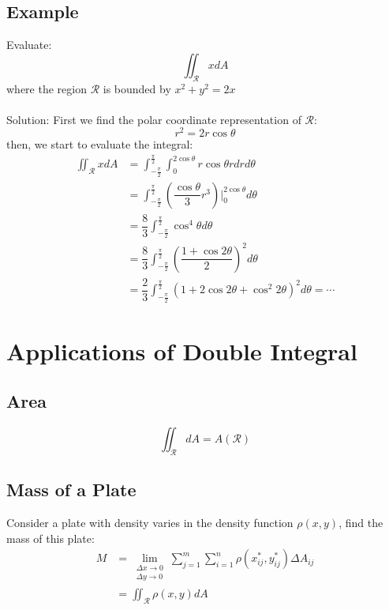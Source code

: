 \documentclass[UTF8,a4paper, 10pt, openany]{book}
\begin{document}
\subsection{Example}
Evaluate:
$$\iint_{\mathcal{R}}xdA$$
where the region $\mathcal{R}$ is bounded by $x^2+y^2=2x$\\ \\
Solution: First we find the polar coordinate representation of $\mathcal{R}$:\\
$$r^2=2r\cos \theta$$
then, we start to evaluate the integral:
\begin{align*}
\iint_{\mathcal{R}}xdA &= \int_{-\frac{\pi}{2}}^{\frac{\pi}{2}}\int_{0}^{2\cos \theta}r\cos \theta rdrd\theta \\
&= \int_{-\frac{\pi}{2}}^{\frac{\pi}{2}} \left(\dfrac{\cos \theta}{3}r^3\right)|_{0}^{2\cos \theta}d\theta \\
&= \dfrac{8}{3}\int_{-\frac{\pi}{2}}^{\frac{\pi}{2}}\cos^4\theta d\theta \\
&= \dfrac{8}{3}\int_{-\frac{\pi}{2}}^{\frac{\pi}{2}}\left(\dfrac{1+\cos 2\theta}{2}\right)^2d\theta \\
&= \dfrac{2}{3}\int_{-\frac{\pi}{2}}^{\frac{\pi}{2}}\left(1+2\cos 2\theta +\cos^2 2\theta \right)^2d\theta =\cdots
\end{align*}
\section{Applications of Double Integral}
\subsection{Area}
$$\iint_{\mathcal{R}}dA=A(\mathcal{R})$$
\subsection{Mass of a Plate}
Consider a plate with density varies in the density function $\rho (x,y)$, find the mass of this plate:
\begin{align*}
M &= \lim_{\substack{\Delta x\to 0 \\ \Delta y\to 0}}\sum_{j=1}^{m}\sum_{i=1}^{n}\rho (x_{ij}^*,y_{ij}^*)\Delta A_{ij}\\
&= \iint_{\mathcal{R}}\rho (x,y)dA
\end{align*}
\end{document}
